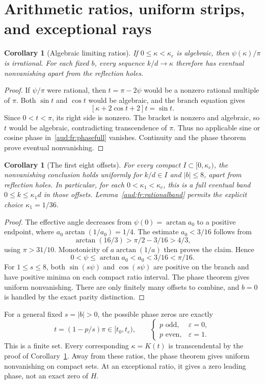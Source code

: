 \documentclass[11pt,a4paper]{article}
\numberwithin{equation}{section}
\newtheorem{corollary}[theorem]{Corollary}
\begin{document}
\section{Arithmetic ratios, uniform strips, and exceptional rays}
\begin{corollary}[Algebraic limiting ratios]\label{aud:fr:algebraic}
If $0\le\kappa<\kappa_c$ is algebraic, then $\psi(\kappa)/\pi$ is irrational. For each fixed $b$, every sequence $k/d\to\kappa$ therefore has eventual nonvanishing apart from the reflection holes.
\end{corollary}
\begin{proof}
If $\psi/\pi$ were rational, then $t=\pi-2\psi$ would be a nonzero rational multiple of $\pi$. Both $\sin t$ and $\cos t$ would be algebraic, and the branch equation gives
\[
 [\kappa+2\cos t+2]t=\sin t.
\]
Since $0<t<\pi$, its right side is nonzero. The bracket is nonzero and algebraic, so $t$ would be algebraic, contradicting transcendence of $\pi$. Thus no applicable sine or cosine phase in~\eqref{aud:fr:phasefull} vanishes. Continuity and the phase theorem prove eventual nonvanishing.
\end{proof}

\begin{corollary}[The first eight offsets]\label{aud:fr:eight}
For every compact $I\subset[0,\kappa_c)$, the nonvanishing conclusion holds uniformly for $k/d\in I$ and $|b|\le8$, apart from reflection holes. In particular, for each $0<\kappa_1<\kappa_c$, this is a full eventual band $0\le k\le\kappa_1d$ in those offsets. Lemma~\ref{aud:fr:rationalband} permits the explicit choice $\kappa_1=1/36$.
\end{corollary}
\begin{proof}
The effective angle decreases from $\psi(0)=\arctan a_0$ to a positive endpoint, where $a_0\arctan(1/a_0)=1/4$. The estimate $a_0<3/16$ follows from
\[
 \arctan(16/3)>\pi/2-3/16>4/3,
\]
using $\pi>31/10$. Monotonicity of $a\arctan(1/a)$ then proves the claim. Hence
\[
 0<\psi\le\arctan a_0<a_0<3/16<\pi/16.
\]
For $1\le s\le8$, both $\sin(s\psi)$ and $\cos(s\psi)$ are positive on the branch and have positive minima on each compact ratio interval. The phase theorem gives uniform nonvanishing. There are only finitely many offsets to combine, and $b=0$ is handled by the exact parity distinction.
\end{proof}

For a general fixed $s=|b|>0$, the possible phase zeros are exactly
\begin{equation}\label{aud:fr:exceptional}
 t=(1-p/s)\pi\in[t_0,t_c),\qquad
 \begin{cases}p\text{ odd},&\varepsilon=0,\\p\text{ even},&\varepsilon=1.\end{cases}
\end{equation}
This is a finite set. Every corresponding $\kappa=K(t)$ is transcendental by the proof of Corollary~\ref{aud:fr:algebraic}. Away from these ratios, the phase theorem gives uniform nonvanishing on compact sets. At an exceptional ratio, it gives a zero leading phase, not an exact zero of $H$.
\end{document}
